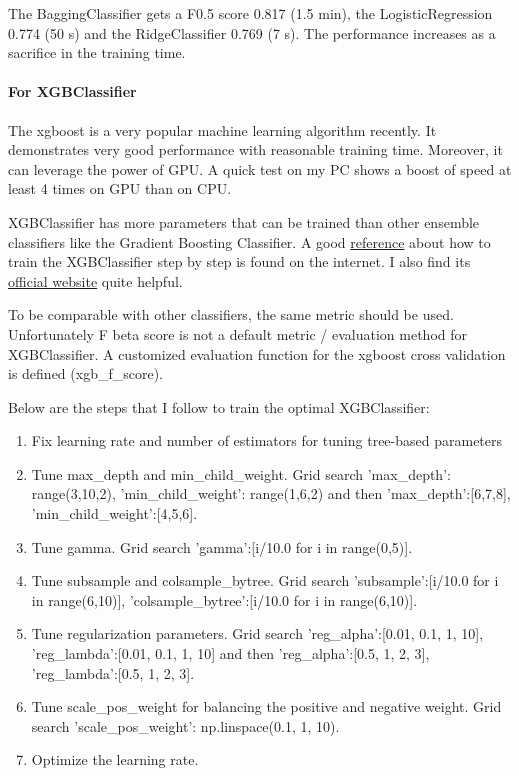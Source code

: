 \documentclass[a4paper]{article}
\begin{document}
			The BaggingClassifier gets a F0.5 score 0.817 (1.5 min), the LogisticRegression 0.774 (50 s) and the RidgeClassifier 0.769 (7 s). The performance increases as a sacrifice in the training time.
			
			\paragraph{For XGBClassifier}	
			The xgboost is a very popular machine learning algorithm recently. It demonstrates very good performance with reasonable training time. Moreover, it can leverage the power of GPU. A quick test on my PC shows a boost of speed at least 4 times on GPU than on CPU.
			
			XGBClassifier has more parameters that can be trained than other ensemble classifiers like the Gradient Boosting Classifier. A good \href{https://www.analyticsvidhya.com/blog/2016/03/complete-guide-parameter-tuning-xgboost-with-codes-python/}{reference} about how to train the XGBClassifier step by step is found on the internet. I also find its \href{http://xgboost.readthedocs.io/en/latest/model.html#}{official website} quite helpful.
			
			To be comparable with other classifiers, the same metric should be used. Unfortunately F beta score is not a default metric / evaluation method for XGBClassifier. A customized evaluation function for the xgboost cross validation is defined (xgb\_f\_score).
			
			Below are the steps that I follow to train the optimal XGBClassifier:
			
			\begin{enumerate}
				\item Fix learning rate and number of estimators for tuning tree-based parameters
				
				\item Tune max\_depth and min\_child\_weight. Grid search {'max\_depth': range(3,10,2), 'min\_child\_weight': range(1,6,2)} and then {'max\_depth':[6,7,8], 'min\_child\_weight':[4,5,6]}.
				
				\item Tune gamma. Grid search {'gamma':[i/10.0 for i in range(0,5)]}.
				
				\item Tune subsample and colsample\_bytree. Grid search {'subsample':[i/10.0 for i in range(6,10)], 'colsample\_bytree':[i/10.0 for i in range(6,10)]}.
				
				\item Tune regularization parameters. Grid search {'reg\_alpha':[0.01, 0.1, 1, 10], 'reg\_lambda':[0.01, 0.1, 1, 10]} and then {'reg\_alpha':[0.5, 1, 2, 3], 'reg\_lambda':[0.5, 1, 2, 3]}.
				
				\item Tune scale\_pos\_weight for balancing the positive and negative weight. Grid search {'scale\_pos\_weight': np.linspace(0.1, 1, 10)}.
				
				\item Optimize the learning rate.				
			\end{enumerate}
			
\end{document}
